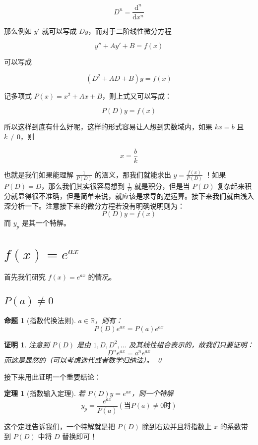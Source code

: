 \documentclass{article}
\newtheorem{thm}{定理}[section]
\newtheorem{prop}{命题}[section]
\newtheorem*{prf}{证明}
\begin{document}
$$
D^n = \frac{\mathrm{d}^n}{\mathrm{d}x^n}
$$

\noindent 那么例如 $y'$ 就可以写成 $Dy$，而对于二阶线性微分方程

$$
y'' + Ay' + B = f(x)
$$

\noindent 可以写成

$$
(D^2+AD+B)y = f(x)
$$

\noindent 记多项式 $P(x) = x^2 + Ax + B$，则上式又可以写成：

$$
P(D)y = f(x)
$$

\noindent 所以这样到底有什么好呢，这样的形式容易让人想到实数域内，如果 $kx = b$ 且 $k\neq 0$，则

$$
x = \frac{b}{k}
$$

\noindent 也就是我们如果能理解 $\frac{1}{P(D)}$ 的涵义，那我们就能求出 $y = \frac{f(x)}{P(D)}$ ！如果 $P(D) = D$，那么我们其实很容易想到 $\frac{1}{D}$ 就是积分，但是当 $P(D)$ 复杂起来积分就显得很不准确，但是简单来说，就应该是求导的逆运算。接下来我们就由浅入深分析一下。注意接下来的微分方程若没有明确说明则为：
$$
P(D)y = f(x)
$$
而 $y_p$ 是其一个特解。

\section{$f(x)=e^{ax}$}

\noindent 首先我们研究 $f(x) = e^{ax}$ 的情况。

\subsection{$P(a) \neq 0$}

\begin{prop}[指数代换法则]
$a\in \mathbb{R}$，则有：
$$
P(D)e^{ax} = P(a)e^{ax}
$$
\end{prop}

\begin{prf}
\noindent 注意到 $P(D)$ 是由 $1, D, D^2, \ldots$ 及其线性组合表示的，故我们只要证明：
$$
D^n e^{ax} = a^n e^{ax}
$$
而这是显然的（可以考虑迭代或者数学归纳法）。
    \qed
\end{prf}

\noindent 接下来用此证明一个重要结论：

\begin{thm}[指数输入定理]
若 $P(D)y = e^{ax}$，则一个特解
$$
y_p = \frac{e^{ax}}{P(a)}(\text{当}P(a)\neq 0 \text{时})
$$
\end{thm}

\noindent 这个定理告诉我们，一个特解就是把 $P(D)$ 除到右边并且将指数上 $x$ 的系数带到 $P(D)$ 中将 $D$ 替换即可！
\end{document}
